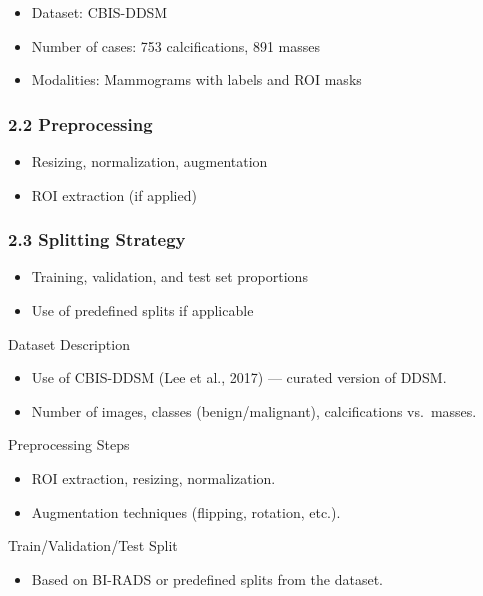 \documentclass[
  12pt,
  letterpaper,
  DIV=11,
  numbers=noendperiod]{scrartcl}
\providecommand{\tightlist}{%
  \setlength{\itemsep}{0pt}\setlength{\parskip}{0pt}}
\begin{document}
\begin{itemize}
\tightlist
\item
  Dataset: CBIS-DDSM
\item
  Number of cases: 753 calcifications, 891 masses
\item
  Modalities: Mammograms with labels and ROI masks
\end{itemize}

\subsubsection{2.2 Preprocessing}\label{preprocessing}

\begin{itemize}
\tightlist
\item
  Resizing, normalization, augmentation
\item
  ROI extraction (if applied)
\end{itemize}

\subsubsection{2.3 Splitting Strategy}\label{splitting-strategy}

\begin{itemize}
\tightlist
\item
  Training, validation, and test set proportions
\item
  Use of predefined splits if applicable
\end{itemize}

Dataset Description

\begin{itemize}
\tightlist
\item
  Use of CBIS-DDSM (Lee et al., 2017) --- curated version of DDSM.
\item
  Number of images, classes (benign/malignant), calcifications
  vs.~masses.
\end{itemize}

Preprocessing Steps

\begin{itemize}
\tightlist
\item
  ROI extraction, resizing, normalization.
\item
  Augmentation techniques (flipping, rotation, etc.).
\end{itemize}

Train/Validation/Test Split

\begin{itemize}
\tightlist
\item
  Based on BI-RADS or predefined splits from the dataset.
\end{itemize}
\end{document}
